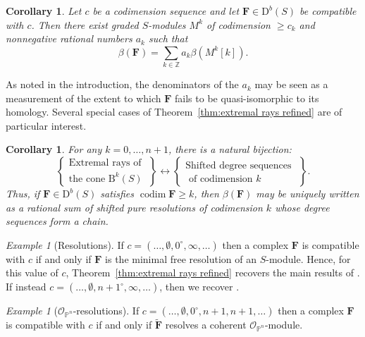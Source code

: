\documentclass[12pt]{amsart}
\newtheorem{cor}[lemma]{Corollary}
\theoremstyle{definition}
\theoremstyle{remark}
\newtheorem{example}[lemma]{Example}
\newcommand{\codim}{\operatorname{codim}}
\newcommand{\PP}{\mathbb{P}}
\newcommand{\ZZ}{\mathbb{Z}}
\newcommand{\bb}{c}
\newcommand{\dd}{d}
\newcommand{\cO}{\mathcal{O}}
\newcommand{\FF}{\mathbf{F}}
\newcommand{\zp}{\circ}
\newcommand{\nothing}{\emptyset}
\newcommand{\DD}{\mathrm{D}}
\newcommand{\BBQ}{\mathrm{B}}
\begin{document}
\begin{cor}\label{cor:decompose refined}
Let $\bb$ be a codimension sequence and let $\FF\in \DD^b(S)$ be compatible with $\bb$.  Then there exist graded $S$-modules $M^k$ of codimension $\geq \bb_k$ and nonnegative rational numbers $a_k$ such that
\[
\beta(\FF)=\sum_{k\in \ZZ} a_k\beta(M^k[k]).
\]
\end{cor}
As noted in the introduction, the denominators of the $a_k$ may be seen as a measurement of the extent to which $\FF$ fails to be quasi-isomorphic to its homology.  Several special cases of Theorem~\ref{thm:extremal rays refined} are of particular interest.

\begin{cor}\label{cor:uniform}
For any $k=0,\dots, n+1$, there is a natural bijection:
\[
\left\{
\begin{matrix}
\text{Extremal rays of }\\
\text{the cone } \BBQ^{k}(S)
\end{matrix}
\right\}
\longleftrightarrow
\left\{
\begin{matrix}
\text{Shifted degree sequences }\\
\text{ of codimension $k$}
\end{matrix}
\right\}.
\]
Thus, if $\FF\in \DD^b(S)$ satisfies $\codim \FF\geq k$, then $\beta(\FF)$ may be uniquely written as a rational sum of shifted pure resolutions of codimension $k$ whose degree sequences form a chain.%
\end{cor}

\begin{example}[Resolutions]\label{ex:resolutions}
If $\bb=(\dots, \nothing, 0^\zp, \infty, \dots)$ then a complex $\FF$ is compatible with $\bb$ if and only if $\FF$ is the minimal free resolution of an $S$-module.  Hence, for this value of $\bb$, Theorem~\ref{thm:extremal rays refined} recovers the main results of \cite{boij-sod2}.  If instead $\bb=(\dots, \nothing, n+1^\zp, \infty, \dots)$, then we recover \cite[Theorem~0.2]{eis-schrey1}.
\end{example}


\begin{example}[$\cO_{\PP^n}$-resolutions]\label{ex:sheaf resolutions}
If $\bb=(\dots,\nothing,0^{\zp},n+1,n+1,\dots)$ then a complex $\FF$ is compatible with $\bb$ if and only if $\widetilde{\FF}$ resolves a coherent $\cO_{\PP^n}$-module.
\end{example}
\end{document}
